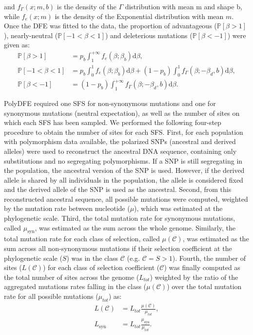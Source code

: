 \documentclass{article}
\newcommand{\der}{\textrm{d}}
\newcommand{\proba}{\mathbb{P}}
\newcommand{\Sphy}{S}
\newcommand{\Sphyclass}{\mathcal{C}}
\newcommand{\divAdv}{ \Sphy > 1}
\newcommand{\Spop}{\beta}
\newcommand{\polyDel}{\Spop < -1}
\newcommand{\polyNeutral}{-1 < \Spop < 1}
\newcommand{\polyAdv}{ \Spop > 1}
\newcommand{\PpolyDel}{\proba \left[ \polyDel \right]}
\newcommand{\PpolyNeutral}{\proba \left[ \polyNeutral \right]}
\newcommand{\PpolyAdv}{\proba \left[ \polyAdv \right]}
\begin{document}
    and $f_{\Gamma}(x; m, b)$ is the density of the $\Gamma$ distribution with mean m and shape b, while $f_{e}(x; m)$ is the density of the Exponential distribution with mean $m$.
    Once the DFE was fitted to the data, the proportion of advantageous ($\PpolyAdv$), nearly-neutral ($\PpolyNeutral$) and deleterious mutations ($\PpolyDel$) were given as:
    \begin{align}
        \PpolyAdv &= p_b \int_{1}^{+\infty} f_{e}(\Spop; \Spop_b) \der \Spop,  \label{eq:polyProbaAdv} \\
        \PpolyNeutral &= p_b \int_{0}^{1} f_{e}(\Spop; \Spop_b) \der \Spop + \left( 1 - p_b \right) \int_{0}^{1} f_{\Gamma}(\Spop; -\Spop_d, b) \der \Spop, \\
        \PpolyDel &= \left( 1 - p_b \right) \int_{1}^{+\infty} f_{\Gamma}(\Spop; -\Spop_d, b) \der \Spop. \label{eq:polyProbaDel}
    \end{align}

    PolyDFE required one SFS for non-synonymous mutations and one for synonymous mutations (neutral expectation), as well as the number of sites on which each SFS has been sampled.
    We performed the following four-step procedure to obtain the number of sites for each SFS.
    First, for each population with polymorphism data available, the polarized SNPs (ancestral and derived alleles) were used to reconstruct the ancestral DNA sequence, containing only substitutions and no segregating polymorphisms.
    If a SNP is still segregating in the population, the ancestral version of the SNP is used.
    However, if the derived allele is shared by all individuals in the population, the allele is considered fixed and the derived allele of the SNP is used as the ancestral.
    Second, from this reconstructed ancestral sequence, all possible mutations were computed, weighted by the mutation rate between nucleotide ($\mu$), which was estimated at the phylogenetic scale.
    Third, the total mutation rate for synonymous mutations, called $\mu_{\textrm{syn}}$, was estimated as the sum across the whole genome.
    Similarly, the total mutation rate for each class of selection, called  $\mu\left( \Sphyclass \right)$, was estimated as the sum across all non-synonymous mutations if their selection coefficient at the phylogenetic scale ($\Sphy$) was in the class $\Sphyclass$ (e.g. $\Sphyclass = \divAdv$).
    Fourth, the number of sites ($L \left( \Sphyclass \right)$) for each class of selection coefficient ($\Sphyclass$) was finally computed as the total number of sites across the genome ($L_{tot}$) weighted by the ratio of the aggregated mutations rates falling in the class ($\mu\left( \Sphyclass \right)$) over the total mutation rate for all possible mutations ($\mu_{tot}$) as:
    \begin{align}
        L \left( \Sphyclass \right) &= L_{tot} \frac{\mu\left( \Sphyclass \right)}{\mu_{tot}}, \\
        L_{\textrm{syn}} &= L_{tot} \frac{\mu_{\textrm{syn}}}{\mu_{tot}}.
    \end{align}
\end{document}
